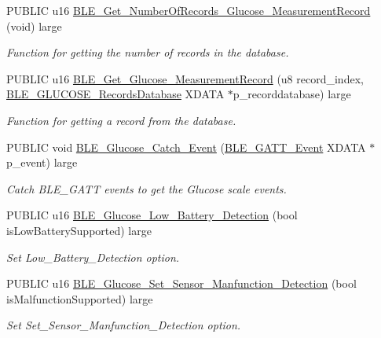 \begin{DoxyCompactItemize}
P\+U\+B\+L\+IC u16 \hyperlink{group___b_l_e___g_s_ga95ec9029e7c94a93f3d255245d0e5e0d}{B\+L\+E\+\_\+\+Get\+\_\+\+Number\+Of\+Records\+\_\+\+Glucose\+\_\+\+Measurement\+Record} (void) large
\begin{DoxyCompactList}\small\item\em Function for getting the number of records in the database. \end{DoxyCompactList}\item 
P\+U\+B\+L\+IC u16 \hyperlink{group___b_l_e___g_s_ga63e70e439d715ab69015f66fa749d300}{B\+L\+E\+\_\+\+Get\+\_\+\+Glucose\+\_\+\+Measurement\+Record} (u8 record\+\_\+index, \hyperlink{struct_b_l_e___g_l_u_c_o_s_e___records_database}{B\+L\+E\+\_\+\+G\+L\+U\+C\+O\+S\+E\+\_\+\+Records\+Database} X\+D\+A\+TA $\ast$p\+\_\+recorddatabase) large
\begin{DoxyCompactList}\small\item\em Function for getting a record from the database. \end{DoxyCompactList}\item 
P\+U\+B\+L\+IC void \hyperlink{group___b_l_e___g_s_gaaf3f248c172a0241f73dea4ed02a4a88}{B\+L\+E\+\_\+\+Glucose\+\_\+\+Catch\+\_\+\+Event} (\hyperlink{struct_b_l_e___g_a_t_t___event}{B\+L\+E\+\_\+\+G\+A\+T\+T\+\_\+\+Event} X\+D\+A\+TA $\ast$p\+\_\+event) large
\begin{DoxyCompactList}\small\item\em Catch B\+L\+E\+\_\+\+G\+A\+TT events to get the Glucose scale events. \end{DoxyCompactList}\item 
P\+U\+B\+L\+IC u16 \hyperlink{group___b_l_e___g_s_ga66b67b9691b6658665a2824c581ebf13}{B\+L\+E\+\_\+\+Glucose\+\_\+\+Low\+\_\+\+Battery\+\_\+\+Detection} (bool is\+Low\+Battery\+Supported) large
\begin{DoxyCompactList}\small\item\em Set Low\+\_\+\+Battery\+\_\+\+Detection option. \end{DoxyCompactList}\item 
P\+U\+B\+L\+IC u16 \hyperlink{group___b_l_e___g_s_ga95e64c6e785881fede9b01fc35e0050e}{B\+L\+E\+\_\+\+Glucose\+\_\+\+Set\+\_\+\+Sensor\+\_\+\+Manfunction\+\_\+\+Detection} (bool is\+Malfunction\+Supported) large
\begin{DoxyCompactList}\small\item\em Set Set\+\_\+\+Sensor\+\_\+\+Manfunction\+\_\+\+Detection option. \end{DoxyCompactList}\item 

\end{DoxyCompactItemize}
